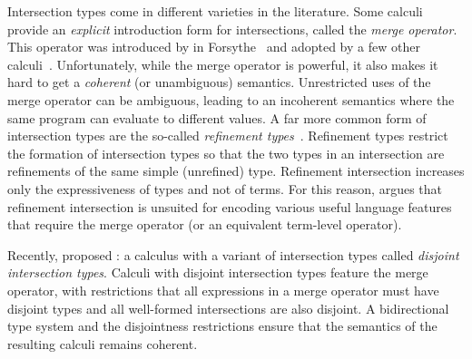Intersection types come in different varieties in the literature. Some calculi
provide an \emph{explicit} introduction form for intersections, called the
\emph{merge operator}. This operator was introduced by \citeauthor{reynolds1988preliminary} in Forsythe~\citep{reynolds1988preliminary} and
adopted by a few other calculi~\citep{Castagna_1992, dunfield2014elaborating, oliveira2016disjoint, alpuimdisjoint}. Unfortunately,
while the merge operator is powerful, it also makes it hard to get a \emph{coherent}
(or unambiguous) semantics.
Unrestricted uses of the merge operator can be ambiguous, leading to an incoherent semantics
where the same program can evaluate to different values.
A far more common form of intersection types are the so-called \emph{refinement
  types}~\citep{Freeman_1991, Davies_2000, dunfield2003type}. Refinement types
restrict the formation of intersection types so that the two types in an
intersection are refinements of the same simple (unrefined) type. Refinement
intersection increases only the expressiveness of types and not of terms.
For this reason, \citet{dunfield2014elaborating} argues that refinement
intersection is unsuited for encoding various useful language features
that require the merge operator (or an equivalent term-level operator).


Recently, \citet{oliveira2016disjoint} proposed \oname: a calculus with a variant of intersection types
called \emph{disjoint intersection types}.
Calculi with disjoint intersection types feature the merge
operator, with restrictions that all expressions in a merge
operator must have disjoint types and all well-formed intersections
are also disjoint. A bidirectional type system and the disjointness restrictions
ensure that the semantics of the resulting calculi remains
coherent.

\begin{comment}
The merge operator was introduced by Reynolds
and Forsythe and adopted by a few other calculi as well~\citep{}.
Unfortunately, while the merge operator is powerful, it makes
it hard to get a \emph{coherent} semantics. \bruno{what is coherence}
Perhaps because
of this issue the merge operator has not been adopted by
many language designs. Disjoint intersection types provide
a remedy for the coherence problem, by imposing restrictions
on the uses of merges and on the formation of intersection types.
\bruno{merge operator ==> models inheritance; intersection types ==>
model subtyping}

In essence disjoint intersection types retain most of the
expressive power of the merge operator.
For example, they can
be used to model powerful forms of extensible records~\citep{}.
\end{comment}

